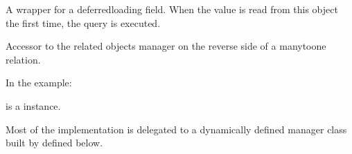 \documentclass[a4paper,11pt,spanish]{sphinxmanual}
\begin{document}
\begin{fulllineitems}

\begin{fulllineitems}
\label{\detokenize{api/inventory/inventory.models:inventory.models.InventoryPeriodSnapshot.id}}
\pysigstartsignatures
\pysigline
{}
\pysigstopsignatures
\sphinxAtStartPar
A wrapper for a deferred\sphinxhyphen{}loading field. When the value is read from this
object the first time, the query is executed.

\end{fulllineitems}


\begin{fulllineitems}
\label{\detokenize{api/inventory/inventory.models:inventory.models.InventoryPeriodSnapshot.inventoryperiodsnapshotitem_set}}
\pysigstartsignatures
\pysigline
{}
\pysigstopsignatures
\sphinxAtStartPar
Accessor to the related objects manager on the reverse side of a
many\sphinxhyphen{}to\sphinxhyphen{}one relation.

\sphinxAtStartPar
In the example:

\begin{sphinxVerbatim}[commandchars=\\\{\}]
       
\end{sphinxVerbatim}

\sphinxAtStartPar
{} is a  instance.

\sphinxAtStartPar
Most of the implementation is delegated to a dynamically defined manager
class built by  defined below.

\end{fulllineitems}



\end{fulllineitems}
\end{document}
